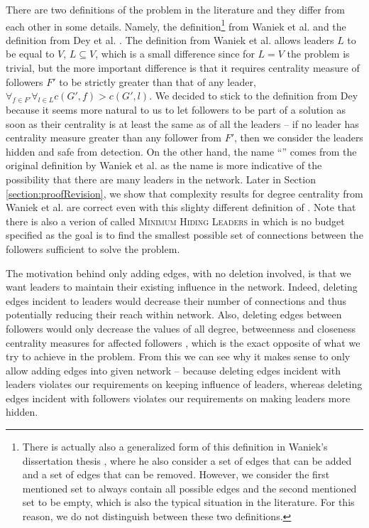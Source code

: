There are two definitions of the \HL problem in the literature and they differ from each other in some details.
Namely, the definition\footnote{
    There is actually also a generalized form of this definition in Waniek's dissertation thesis \cite{WaniekPhD2017},
    where he also consider a set of edges that can be added and a set of edges that can be removed.
    However, we consider the first mentioned set to always contain all possible edges and the second mentioned set
    to be empty, which is also the typical situation in the literature.
    For this reason, we do not distinguish between these two definitions.
}
from Waniek et al. \cite{Waniek2017} and the definition from Dey et al. \cite{Dey2019}.
The definition from Waniek et al. \cite{Waniek2017} allows leaders $L$ to be equal to $V$, $L \subseteq V$,
which is a small difference since for $L = V$ the problem is trivial, but the more important difference is that
it requires centrality measure of followers $F'$ to be strictly greater than that of any leader,
$\forall_{f \in F'} \forall_{l \in L} c(G', f) > c(G', l)$.
We decided to stick to the definition from Dey \cite{Dey2019} because it seems more natural to us to let followers
to be part of a solution as soon as their centrality is at least the same as of all the leaders --
if no leader has centrality measure greater than any follower from $F'$, then
we consider the leaders hidden and safe from detection.
On the other hand, the name ``\HL'' comes from the original definition by Waniek et al. as
the name is more indicative of the possibility that there are many leaders in the network.
Later in Section \ref{section:proofRevision}, we show that complexity results for degree centrality from Waniek et al.
are correct even with this slighty different definition of \HLshort.
Note that there is also a verion of \HL called \textsc{Minimum Hiding Leaders} \cite{Waniek2021}
in which is no budget specified as the goal is to find the smallest possible set of connections between the followers
sufficient to solve the problem.

The motivation behind only adding edges, with no deletion involved, is that we want leaders to maintain
their existing influence in the network.
Indeed, deleting edges incident to leaders would decrease their number of connections and thus potentially
reducing their reach within network.
Also, deleting edges between followers would only decrease the values of all degree, betweenness and closeness
centrality measures for affected followers \cite{Waniek2016},
which is the exact opposite of what we try to achieve in the \HL problem.
From this we can see why it makes sense to only allow adding edges into given network --
because deleting edges incident with leaders violates our requirements on keeping influence of leaders,
whereas deleting edges incident with followers violates our requirements on making leaders more hidden.

